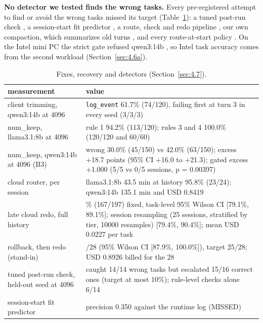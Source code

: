 \documentclass[conference,10pt]{IEEEtran}
\begin{document}
\textbf{No detector we tested finds the wrong tasks.} Every pre-registered attempt to find or avoid the wrong tasks missed its target (Table~\ref{tab:fixes}): a tuned post-run check%
, a session-start fit predictor%
, a route, check and redo pipeline%
, our own compaction, which summarizes old turns%
, and every route-at-start policy%
. On the Intel mini PC the strict gate refused qwen3:14b%
, so Intel task accuracy comes from the second workload (Section~\ref{sec:4.6a}).

\begin{table}[t]
\caption{Fixes, recovery and detectors (Section~\ref{sec:4.7}).}
\label{tab:fixes}
\centering\footnotesize
\begin{tabular}{@{}>{\raggedright\arraybackslash}p{}>{\raggedright\arraybackslash}p{}@{}}
\toprule
measurement & value \\
\midrule
client trimming, qwen3:14b at 4096 & \texttt{log\_event} 61.7\% (74/120), failing first at turn 3 in every seed (3/3/3)  \\
num\_keep, llama3.1:8b at 4096 & rule 1 94.2\% (113/120); rules 3 and 4 100.0\% (120/120 and 60/60)  \\
num\_keep, qwen3:14b at 4096 (B3) & wrong 30.0\% (45/150) vs 42.0\% (63/150); excess +18.7 points (95\% CI +16.0 to +21.3); gated excess +1.000 (5/5 vs 0/5 sessions, p = 0.00397)  \\
cloud router, per session & llama3.1:8b 43.5 min at history 95.8\% (23/24); qwen3:14b 135.1 min and USD 0.8419  \\
late cloud redo, full history & 84.8\% (167/197) fixed, task-level 95\% Wilson CI [79.1\%, 89.1\%]; session resampling (25 sessions, stratified by tier, 10000 resamples) [79.4\%, 90.4\%]; mean USD 0.0227 per task  \\
rollback, then redo (stand-in) & 28/28 (95\% Wilson CI [87.9\%, 100.0\%]), target 25/28; USD 0.8926 billed for the 28  \\
tuned post-run check, held-out seed at 4096 & caught 14/14 wrong tasks but escalated 15/16 correct ones (target at most 10\%); rule-level checks alone 6/14  \\
session-start fit predictor & precision 0.350 against the runtime log (MISSED)  \\

\end{tabular}
\end{table}
\end{document}
